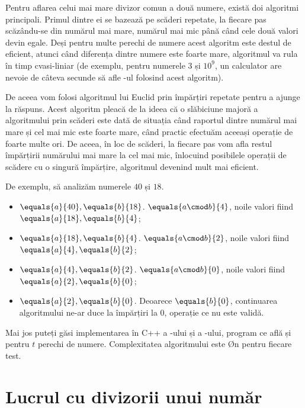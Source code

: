 Pentru aflarea celui mai mare divizor comun a două numere, există doi algoritmi principali. Primul dintre ei se bazează pe scăderi repetate, la fiecare pas scăzându-se din numărul mai mare, numărul mai mic până când cele două valori devin egale. Deși pentru multe perechi de numere acest algoritm este destul de eficient, atunci când diferența dintre numere este foarte mare, algoritmul va rula în timp cvasi-liniar (de exemplu, pentru numerele $3$ și $10^9$, un calculator are nevoie de câteva secunde să afle \cmmdc-ul folosind acest algoritm).

De aceea vom folosi algoritmul lui Euclid prin împărțiri repetate pentru a ajunge la răspuns. Acest algoritm pleacă de la ideea că o slăbiciune majoră a algoritmului prin scăderi este dată de situația când raportul dintre numărul mai mare și cel mai mic este foarte mare, când practic efectuăm aceeași operație de foarte multe ori. De aceea, în loc de scăderi, la fiecare pas vom afla restul împărțirii numărului mai mare la cel mai mic, înlocuind posibilele operații de scădere cu o singură împărțire, algoritmul devenind mult mai eficient. 

De exemplu, să analizăm numerele $40$ și $18$.

\begin{itemize}
    \item $\equals{a}{40}, \equals{b}{18}$. $\equals{a \cmod b}{4}$, noile valori fiind $\equals{a}{18}, \equals{b}{4}$;
    \item $\equals{a}{18}, \equals{b}{4}$. $\equals{a \cmod b}{2}$, noile valori fiind $\equals{a}{4}, \equals{b}{2}$;
    \item $\equals{a}{4}, \equals{b}{2}$. $\equals{a \cmod b}{0}$, noile valori fiind $\equals{a}{2}, \equals{b}{0}$;
    \item $\equals{a}{2}, \equals{b}{0}$. Deoarece $\equals{b}{0}$, continuarea algoritmului ne-ar duce la împărțiri la $0$, operație ce nu este validă.
\end{itemize}

Mai jos puteți găsi implementarea în C++ a \cmmdc-ului și a \cmmmc-ului, program ce află \cmmdc{} și \cmmmc{} pentru $t$ perechi de numere. Complexitatea algoritmului este \O{\log n} pentru fiecare test.


\section{Lucrul cu divizorii unui număr}

